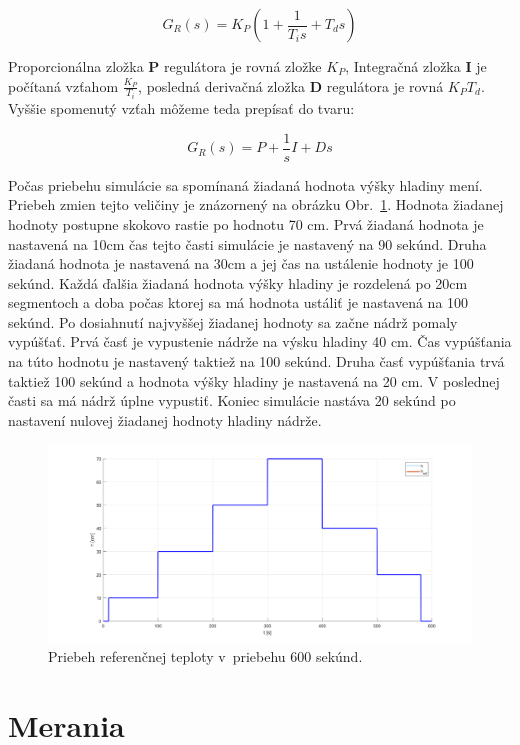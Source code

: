 \documentclass{article}
\begin{document}
$$ G_R(s) = K_P \left( 1 + \frac{1}{T_is} + T_ds \right) $$

Proporcionálna zložka \textbf{P} regulátora je rovná zložke $K_P$, Integračná zložka \textbf{I} je počítaná vzťahom
$\frac{K_P}{T_i}$, posledná derivačná zložka \textbf{D} regulátora je rovná $K_P T_d$.
Vyššie spomenutý vzťah môžeme teda prepísať do tvaru:

$$ G_R(s) = P  + \frac{1}{s}I + Ds $$

Počas priebehu simulácie sa spomínaná žiadaná hodnota výšky hladiny mení. Priebeh zmien tejto veličiny je znázornený
na obrázku Obr.~\ref{fig:ziadanaHodnota}. Hodnota žiadanej hodnoty postupne skokovo rastie po hodnotu 70 cm. Prvá
žiadaná hodnota je nastavená na 10cm čas tejto časti simulácie je nastavený na 90 sekúnd. Druha žiadaná hodnota
je nastavená na 30cm a jej čas na ustálenie hodnoty je 100 sekúnd. Každá ďalšia žiadaná hodnota výšky hladiny
je rozdelená po 20cm segmentoch a doba počas ktorej sa má hodnota ustáliť je nastavená na 100 sekúnd. Po dosiahnutí
najvyššej žiadanej hodnoty sa začne nádrž pomaly vypúšťať. Prvá časť je vypustenie nádrže na výsku hladiny 40 cm.
Čas vypúšťania na túto hodnotu je nastavený taktiež na 100 sekúnd. Druha časť vypúšťania trvá taktiež 100 sekúnd
a hodnota výšky hladiny je nastavená na 20 cm. V poslednej časti sa má nádrž úplne vypustiť. Koniec simulácie nastáva
20 sekúnd po nastavení nulovej žiadanej hodnoty hladiny nádrže.

\begin{figure}[!htbp]
	\begin{center}
		\includegraphics[width=\textwidth]{./include/ziadana_hodnota.png}
		\caption{Priebeh referenčnej teploty v~priebehu 600 sekúnd.}
		\label{fig:ziadanaHodnota}
	\end{center}
	\hfill
\end{figure}

\newpage

\section{Merania}
\label{sec:merania}
\end{document}
